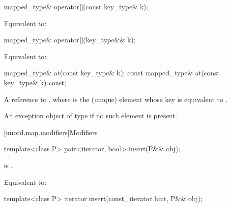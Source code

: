 %
%
\begin{itemdecl}
mapped_type& operator[](const key_type& k);
\end{itemdecl}

\begin{itemdescr}
\pnum
\effects
Equivalent to: 
\end{itemdescr}

%
%
\begin{itemdecl}
mapped_type& operator[](key_type&& k);
\end{itemdecl}

\begin{itemdescr}
\pnum
\effects
Equivalent to: 
\end{itemdescr}

%
%
\begin{itemdecl}
mapped_type& at(const key_type& k);
const mapped_type& at(const key_type& k) const;
\end{itemdecl}

\begin{itemdescr}
\pnum
\returns
A reference to , where  is the (unique) element whose key is equivalent to .

\pnum
\throws
An exception object of type  if no such element is present.
\end{itemdescr}

[unord.map.modifiers]{Modifiers}

%
\begin{itemdecl}
template<class P>
  pair<iterator, bool> insert(P&& obj);
\end{itemdecl}

\begin{itemdescr}

\pnum
\constraints
{} is .

\pnum
\effects
Equivalent to: 
\end{itemdescr}

%
\begin{itemdecl}
template<class P>
  iterator insert(const_iterator hint, P&& obj);
\end{itemdecl}

